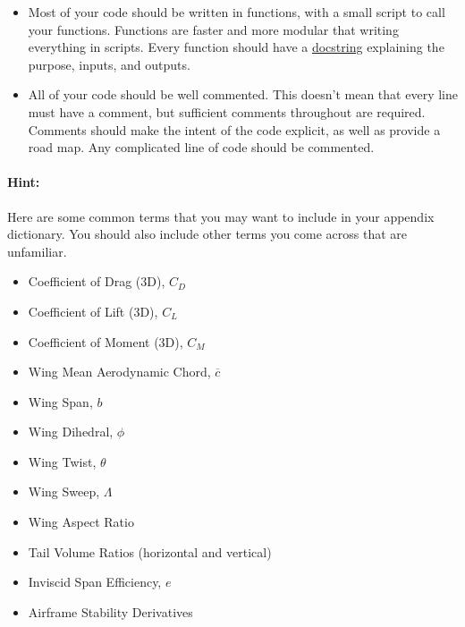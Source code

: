 \documentclass[12pt]{article}
\begin{document}
\begin{enumerate}
	\begin{itemize}
		\item Most of your code should be written in functions, with a small script to call your functions. Functions are faster and more modular that writing everything in scripts.  Every function should have a \href{https://docs.julialang.org/en/v1/manual/documentation/#Writing-Documentation}{docstring} explaining the purpose, inputs, and outputs. 
		\item All of your code should be well commented. This doesn't mean that every line must have a comment, but sufficient comments throughout are required. Comments should make the intent of the code explicit, as well as provide a road map. Any complicated line of code should be commented. 
	\end{itemize}
\end{enumerate}

\bigskip

\paragraph{Hint:} Here are some common terms that you may want to include in your appendix dictionary. You should also include other terms you come across that are unfamiliar.

\begin{multicols}{2}
	\begin{itemize}
		\item Coefficient of Drag (3D), $C_D$
		\item Coefficient of Lift (3D), $C_L$
		\item Coefficient of Moment (3D), $C_M$
		\item Wing Mean Aerodynamic Chord, $\overline{c}$
		\item Wing Span, $b$
		\item Wing Dihedral, $\phi$
		\item Wing Twist, $\theta$
		\item Wing Sweep, $\Lambda$
		\item Wing Aspect Ratio
		\item Tail Volume Ratios (horizontal and vertical)
		\item Inviscid Span Efficiency, $e$
		\item Airframe Stability Derivatives
	\end{itemize}
\end{multicols}



\end{document}
